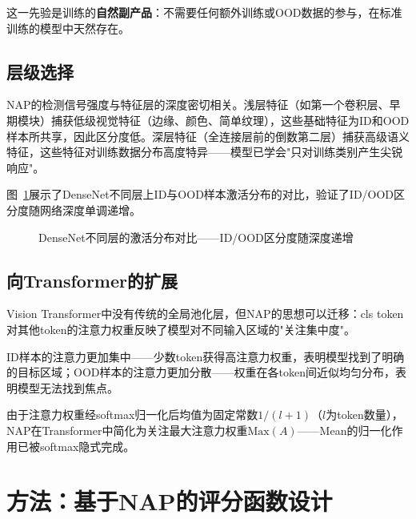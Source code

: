 这一先验是训练的\textbf{自然副产品}：不需要任何额外训练或OOD数据的参与，在标准训练的模型中天然存在。

\subsection{层级选择}

NAP的检测信号强度与特征层的深度密切相关。浅层特征（如第一个卷积层、早期模块）捕获低级视觉特征（边缘、颜色、简单纹理），这些基础特征为ID和OOD样本所共享，因此区分度低。深层特征（全连接层前的倒数第二层）捕获高级语义特征，这些特征对训练数据分布高度特异——模型已学会"只对训练类别产生尖锐响应"。

图~\ref{fig:nap-layer-analysis}展示了DenseNet\cite{huang2017densely}不同层上ID与OOD样本激活分布的对比，验证了ID/OOD区分度随网络深度单调递增。%

\begin{figure}[htb]
  \centering
  \caption{DenseNet不同层的激活分布对比——ID/OOD区分度随深度递增}
  \label{fig:nap-layer-analysis}
\end{figure}

\subsection{向Transformer的扩展}

Vision Transformer\cite{dosovitskiy2020image}中没有传统的全局池化层，但NAP的思想可以迁移：cls token对其他token的注意力权重反映了模型对不同输入区域的"关注集中度"。

ID样本的注意力更加集中——少数token获得高注意力权重，表明模型找到了明确的目标区域；OOD样本的注意力更加分散——权重在各token间近似均匀分布，表明模型无法找到焦点。

由于注意力权重经softmax归一化后均值为固定常数$1/(l+1)$（$l$为token数量），NAP在Transformer中简化为关注最大注意力权重$\text{Max}(A)$——Mean的归一化作用已被softmax隐式完成。


\section{方法：基于NAP的评分函数设计}

